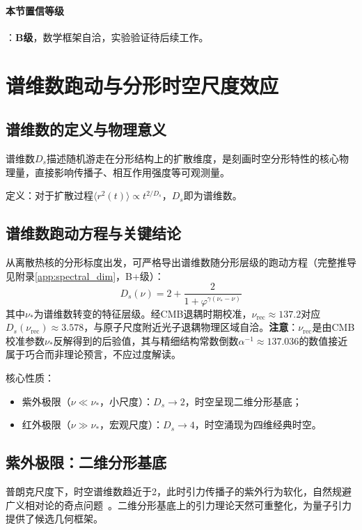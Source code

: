 \documentclass[12pt,a4paper,twocolumn]{article}
\renewcommand{\phi}{\varphi}
\begin{document}
\paragraph{本节置信等级}：\textbf{B级}，数学框架自洽，实验验证待后续工作。

\section{谱维数跑动与分形时空尺度效应}
\label{sec:spectral_dimension}

\subsection{谱维数的定义与物理意义}
谱维数$D_s$描述随机游走在分形结构上的扩散维度，是刻画时空分形特性的核心物理量，直接影响传播子、相互作用强度等可观测量。

定义：对于扩散过程$\langle r^2(t) \rangle \propto t^{2/D_s}$，$D_s$即为谱维数。

\subsection{谱维数跑动方程与关键结论}
\label{subsec:spectral_running}
从离散热核的分形标度出发，可严格导出谱维数随分形层级的跑动方程（完整推导见附录\ref{app:spectral_dim}，B+级）：
\[
D_s(\nu) = 2 + \frac{2}{1 + \phi^{\gamma(\nu_* - \nu)}}
\]
其中$\nu_*$为谱维数转变的特征层级。经CMB退耦时期校准，$\nu_{\text{rec}}\approx137.2$对应$D_s(\nu_{\text{rec}})\approx3.578$，与原子尺度附近光子退耦物理区域自洽。\textbf{注意}：$\nu_{\text{rec}}$是由CMB校准参数$\nu_*$反解得到的后验值，其与精细结构常数倒数$\alpha^{-1}\approx137.036$的数值接近属于巧合而非理论预言，不应过度解读。

核心性质：
\begin{itemize}
\item 紫外极限（$\nu \ll \nu_*$，小尺度）：$D_s \to 2$，时空呈现二维分形基底；
\item 红外极限（$\nu \gg \nu_*$，宏观尺度）：$D_s \to 4$，时空涌现为四维经典时空。
\end{itemize}

\subsection{紫外极限：二维分形基底}
普朗克尺度下，时空谱维数趋近于2，此时引力传播子的紫外行为软化，自然规避广义相对论的奇点问题~\cite{tHooft1993}。二维分形基底上的引力理论天然可重整化，为量子引力提供了候选几何框架。
\end{document}
